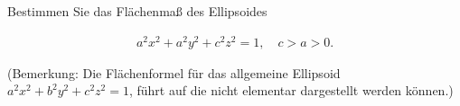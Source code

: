 
\begin{exercise}

Bestimmen Sie das Flächenmaß des Ellipsoides

\begin{align*}
    a^2 x^2 + a^2 y^2 + c^2 z^2 = 1,
    \quad
    c > a > 0.
\end{align*}

(Bemerkung: Die Flächenformel für das allgemeine Ellipsoid $a^2 x^2 + b^2 y^2 + c^2 z^2 = 1$, führt auf  die nicht elementar dargestellt werden können.)

\end{exercise}


